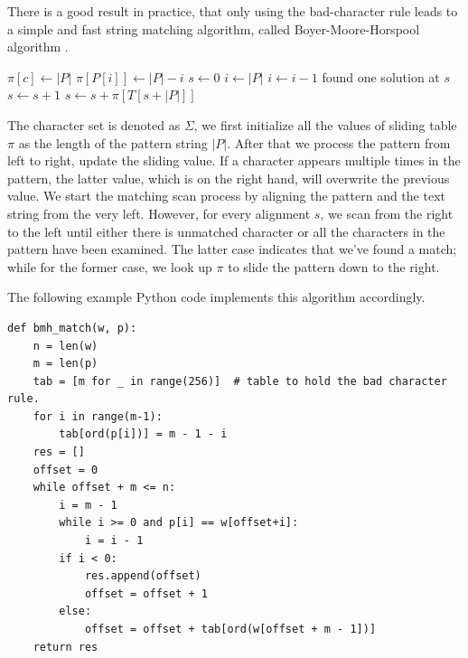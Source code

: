 \documentclass[UTF8]{article}
\begin{document}
There is a good result in practice, that only using the bad-character rule leads to a simple
and fast string matching algorithm, called Boyer-Moore-Horspool algorithm
\cite{boyer-moore-horspool}.

\begin{algorithmic}[1]
    \State $\pi[c] \gets |P|$
  \EndFor
   
    \State $\pi[P[i]] \gets |P| - i$
  \EndFor
  \State $s \gets 0$
    \State $i \gets |P|$
     
      \State $i \gets i - 1$
    \EndWhile
      \State found one solution at $s$
      \State $s \gets s + 1$ 
    \Else
      \State $s \gets s + \pi[T[s + |P|]]$
    \EndIf
  \EndWhile
\EndProcedure
\end{algorithmic}

The character set is denoted as $\Sigma$, we first initialize all the values of sliding table $\pi$ as the length
of the pattern string $|P|$. After that we process the pattern from left to right, update the sliding value.
If a character appears multiple times in the pattern, the latter value, which is on the right hand, will overwrite
the previous value. We start the matching scan process by aligning the pattern and the text string from the very left.
However, for every alignment $s$, we scan from the right to the left until either there is unmatched character or
all the characters in the pattern have been examined. The latter case indicates that we've found a match; while for
the former case, we look up $\pi$ to slide the pattern down to the right.

The following example Python code implements this algorithm accordingly.

\lstset{language=Python}
\begin{lstlisting}
def bmh_match(w, p):
    n = len(w)
    m = len(p)
    tab = [m for _ in range(256)]  # table to hold the bad character rule.
    for i in range(m-1):
        tab[ord(p[i])] = m - 1 - i
    res = []
    offset = 0
    while offset + m <= n:
        i = m - 1
        while i >= 0 and p[i] == w[offset+i]:
            i = i - 1
        if i < 0:
            res.append(offset)
            offset = offset + 1
        else:
            offset = offset + tab[ord(w[offset + m - 1])]
    return res
\end{lstlisting}
\end{document}
